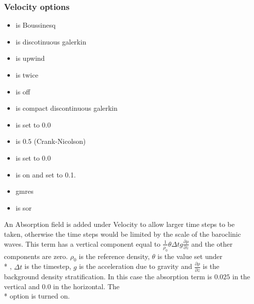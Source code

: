 \subsubsection{Velocity options}
\begin{itemize}
\item {} is Boussinesq
\item {} is discotinuous galerkin
\item {} is upwind
\item {} is twice
\item {} is off
\item {} is compact discontinuous galerkin
\item {} is set to $0.0$
\item {} is $0.5$ (Crank-Nicolson)
\item {} is set to $0.0$
\item {} is on and set to 0.1.
\item {}  gmres 
\item {} is sor
\end{itemize}
An Absorption field is added under Velocity to allow larger time steps to be taken, otherwise the time steps would be limited by the scale of the baroclinic waves.  This term has a vertical component equal to  ${\frac{1}{\rho_0}} {\theta} {\Delta} {t} {g} {\frac{\partial \rho}{\partial z}}$ and the other components are zero. $\rho_0$ is the reference density, $\theta$ is the value set under \\* , ${\Delta} {t} $ is the timestep, $g$ is the acceleration due to gravity and $\frac{\partial \rho}{\partial z}$ is the background density stratification.   In this case the absorption term is $0.025$ in the vertical and $0.0$ in the horizontal. The \\*  option is turned on.


